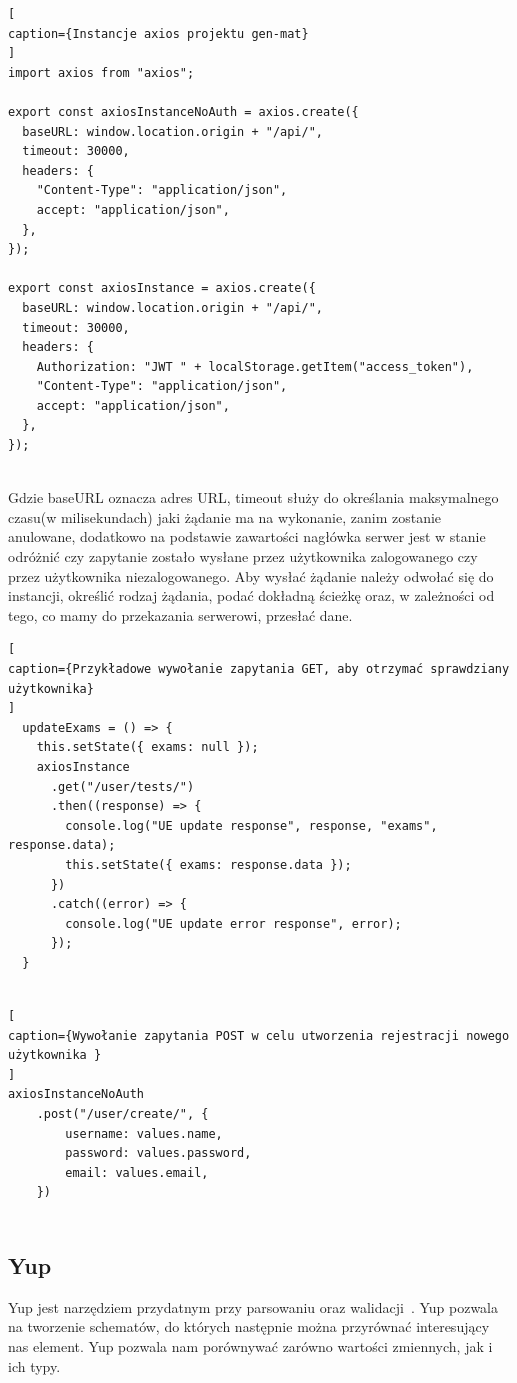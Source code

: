 \documentclass[oneside,polski,logo,indent]{amuthesis}
\begin{document}
\begin{lstlisting}[
caption={Instancje axios projektu gen-mat}
]
import axios from "axios";

export const axiosInstanceNoAuth = axios.create({
  baseURL: window.location.origin + "/api/",
  timeout: 30000,
  headers: {
    "Content-Type": "application/json",
    accept: "application/json",
  },
});

export const axiosInstance = axios.create({
  baseURL: window.location.origin + "/api/",
  timeout: 30000,
  headers: {
    Authorization: "JWT " + localStorage.getItem("access_token"),
    "Content-Type": "application/json",
    accept: "application/json",
  },
});


\end{lstlisting}

Gdzie baseURL oznacza adres URL, timeout służy do określania maksymalnego czasu(w milisekundach) jaki żądanie ma na wykonanie, zanim zostanie anulowane, dodatkowo na podstawie zawartości nagłówka serwer jest w stanie odróżnić czy zapytanie zostało wysłane przez użytkownika zalogowanego czy przez użytkownika niezalogowanego. Aby wysłać żądanie należy  odwołać się do instancji, określić rodzaj żądania, podać dokładną ścieżkę oraz, w zależności od tego, co mamy do przekazania serwerowi, przesłać dane.

\begin{lstlisting}[
caption={Przykładowe wywołanie zapytania GET, aby otrzymać sprawdziany użytkownika}
]
  updateExams = () => {
    this.setState({ exams: null });
    axiosInstance
      .get("/user/tests/")
      .then((response) => {
        console.log("UE update response", response, "exams", response.data);
        this.setState({ exams: response.data });
      })
      .catch((error) => {
        console.log("UE update error response", error);
      });
  }


\end{lstlisting}

\pagebreak
\begin{lstlisting}[
caption={Wywołanie zapytania POST w celu utworzenia rejestracji nowego użytkownika }
]
axiosInstanceNoAuth
	.post("/user/create/", {
		username: values.name,
		password: values.password,
		email: values.email,
	})


\end{lstlisting}


\subsection{Yup}
Yup jest narzędziem przydatnym przy parsowaniu oraz walidacji~\cite{yup}. Yup pozwala na tworzenie schematów, do których następnie
można przyrównać interesujący nas element. Yup pozwala nam porównywać zarówno wartości zmiennych, jak i ich typy.
\end{document}
